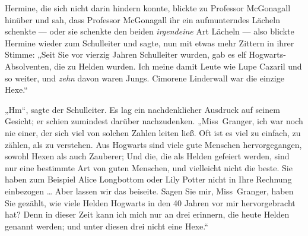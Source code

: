 Hermine, die sich nicht darin hindern konnte, blickte zu Professor McGonagall hinüber und sah, dass Professor McGonagall ihr ein aufmunterndes Lächeln schenkte — oder sie schenkte den beiden \emph{irgendeine} Art Lächeln — also blickte Hermine wieder zum Schulleiter und sagte, nun mit etwas mehr Zittern in ihrer Stimme:
„Seit Sie vor vierzig Jahren Schulleiter wurden, gab es elf Hogwarts-Absolventen, die zu Helden wurden. Ich meine damit Leute wie Lupe Cazaril und so weiter, und \emph{zehn} davon waren Jungs. Cimorene Linderwall war die einzige Hexe.“

„Hm“, sagte der Schulleiter. Es lag ein nachdenklicher Ausdruck auf seinem Gesicht; er schien zumindest darüber nachzudenken.
„Miss~Granger, ich war noch nie einer, der sich viel von solchen Zahlen leiten ließ. Oft ist es viel zu einfach, zu zählen, als zu verstehen. Aus Hogwarts sind viele gute Menschen hervorgegangen, sowohl Hexen als auch Zauberer; Und die, die als Helden gefeiert werden, sind nur eine bestimmte Art von guten Menschen, und vielleicht nicht die beste. Sie haben zum Beispiel Alice Longbottom oder Lily Potter nicht in Ihre Rechnung einbezogen … Aber lassen wir das beiseite. Sagen Sie mir, Miss~Granger, haben Sie gezählt, wie viele Helden Hogwarts in den 40 Jahren vor mir hervorgebracht hat? Denn in dieser Zeit kann ich mich nur an drei erinnern, die heute Helden genannt werden; und unter diesen drei nicht eine Hexe.“

